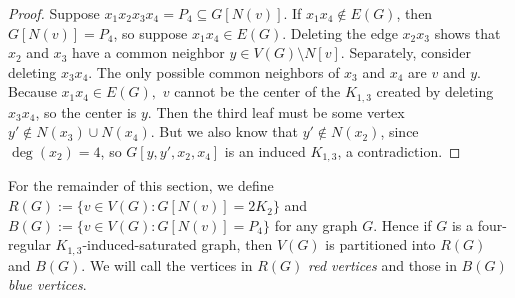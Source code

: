 \documentclass[12pt]{amsart}
\theoremstyle{plain}
\theoremstyle{definition}
\theoremstyle{remark}
\newtheorem*{rmk}{Remark}
\newcommand{\claw}{\ensuremath{K_{1,3}}\xspace}
\begin{document}
{\begin{proof}
Suppose $x_1x_2x_3x_4=P_4 \subseteq G[N(v)]$.
If $x_1x_4 \not\in E(G)$, then $G[N(v)]=P_4$, so suppose $x_1x_4 \in E(G)$.
Deleting the edge $x_2x_3$ shows that $x_2$ and $x_3$ have a common neighbor $y \in V(G) \setminus N[v]$. Separately, consider deleting $x_3x_4$. The only possible common neighbors of $x_3$ and $x_4$ are $v$ and $y$. Because $x_1x_4 \in E(G),$  $v$ cannot be the center of the \claw created by deleting $x_3x_4$, so the center is $y$. Then the third leaf must be some vertex $y' \not\in N(x_3) \cup N(x_4)$. But we also know that $y' \not\in N(x_2)$, since $\deg(x_2)=4$, so $G[y,y',x_2,x_4]$ is an induced \claw, a contradiction.
\end{proof}


For the remainder of this section, we define $R(G):=\{v\in V(G):G[N(v)]=2K_2\}$ and $B(G):=\{v\in V(G):G[N(v)]=P_4\}$ for any graph $G$.
Hence if $G$ is a four-regular \claw-induced-saturated graph, then $V(G)$ is partitioned into $R(G)$ and $B(G)$.
We will call the vertices in $R(G)$ {\it red vertices} and those in $B(G)$ {\it blue vertices}.



}
\end{document}
